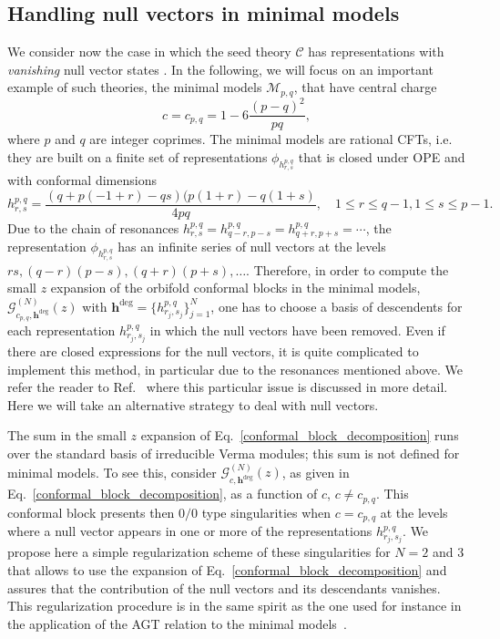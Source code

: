 \documentclass[a4paper,11pt]{article}
\begin{document}
\subsection{Handling null vectors in minimal models}\label{sec:null_vectors}
\label{null_vec1}
We consider now the case in which the seed theory $\mathcal{C}$ has representations with {\it vanishing} null vector states \cite{BPZ}. 
In the following, we will focus on an important example of such theories, the minimal models $\mathcal{M}_{p,q}$, that have central charge
\begin{equation}\label{central_charge_min_mod}
c=c_{p,q}= 1 -6\frac{ (p-q)^2}{p q},
\end{equation}
where $p$ and $q$ are integer coprimes. The minimal models are rational CFTs, i.e. they are built on a finite set of representations $\phi_{h^{p,q}_{r,s}}$ that is closed under OPE and with conformal dimensions
 \begin{equation}\label{conf_dim_min_mod}
 h^{p,q}_{r,s}=\frac{(q + p (-1 + r) - q s) (p (1 + r) - q (1 + s)}{4 p q}, \quad 1\leq r\leq q-1,  1\leq s\leq p-1.
 \end{equation}
Due to the chain of resonances $h_{r,s}^{p, q}=h_{q-r,p-s}^{p, q}=h_{q+r,p+s}^{p, q}=\cdots$, the representation $\phi_{h^{p,q}_{r,s}}$ has an infinite series of null vectors at the levels $r s, (q-r)(p-s),(q+r)(p+s), \dots$. Therefore, in order to compute the small $z$ expansion of the orbifold conformal blocks in the minimal models, $\mathcal{G}_{c_{p,q}, \boldsymbol{h}^{\text{deg}}}^{(N)}(z)$ with $\boldsymbol{h}^{\text{deg}}=\{h_{r_j, s_j}^{p, q}\}_{j=1}^N$, one has to choose a basis of descendents for each representation $h_{r_j, s_j}^{p, q}$ in which the null vectors have been removed. Even if there are closed expressions for the null vectors, it is quite complicated to implement this method, in particular due to the resonances mentioned above. We refer the reader to Ref.~\cite{Javerzat} where this particular issue is discussed in more detail. Here we will take an alternative strategy to deal with null vectors.
 
The sum in the small $z$ expansion of Eq.~\eqref{conformal_block_decomposition} runs over the standard basis of irreducible Verma modules; this sum  is not defined for minimal models. To see this, consider $\mathcal{G}_{c, \boldsymbol{h}^{\text{deg}}}^{(N)}(z)$, as given in Eq.~\eqref{conformal_block_decomposition}, as a function of $c$, $c\neq c_{p,q}$.  This conformal block presents then $0/0$ type singularities when $c=c_{p, q}$ at the levels where a null vector appears in one or more of the representations $h_{r_j, s_j}^{p, q}$. We propose here a simple regularization scheme of these singularities for $N=2$ and $3$ that allows to use the expansion of Eq.~\eqref{conformal_block_decomposition} and assures that the contribution of the null vectors and its descendants vanishes. This regularization procedure is in the same spirit as the one used for instance in the application of the AGT relation to the minimal models~\cite{Tanzini,Alkalaev,FodaAGT}.
\end{document}
